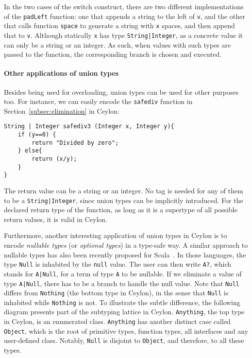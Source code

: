 In the two cases of the switch construct, there are two different implementations
of the \lstinline{padLeft} function: one that appends a string to the left of \lstinline{v},
and the other that calls function \lstinline{space} to generate a string with \lstinline{x} spaces,
and then append that to \lstinline{v}.
Although statically \lstinline{x} has type \lstinline{String|Integer}, as a concrete value
it can only be a string or an integer.
As such, when values with such types are passed to the function,
the corresponding branch is chosen and executed.

\paragraph{Other applications of union types}
Besides being used for overloading, union types can be used for other purposes too.
For instance, we can easily encode the \lstinline{safediv} function in Section~\ref{subsec:elimination}
in Ceylon:
%
\begin{lstlisting}
String | Integer safediv3 (Integer x, Integer y){
	if (y==0) {
		return "Divided by zero";
	} else{
		return (x/y);
	}
}
\end{lstlisting}
%
The return value can be a string or an integer.
No tag is needed for any of them to be a \lstinline{String|Integer},
since union types can be implicitly introduced.
For the declared return type of the function, as long as it is
a supertype of all possible return values, it is valid
in Ceylon.


Furthermore, another interesting application of union types in Ceylon is to
encode \textit{nullable types} (or \textit{optional types}) in a type-safe way.
A similar approach to nullable types has also been recently proposed for
Scala~\citep{nieto20nulls}. In those languages, the type \lstinline{Null} is
inhabited by the \lstinline{null} value. The user can then write \lstinline{A?},
which stands for \lstinline{A|Null}, for a term of type \lstinline{A} to be
nullable. If we eliminate a value of type \lstinline{A|Null}, there has to be a
branch to handle the null value. Note that \lstinline{Null} differs from
\lstinline{Nothing} (the bottom type in Ceylon), in the sense that
\lstinline{Null} is inhabited while \lstinline{Nothing} is not. To illustrate
the subtle difference, the following diagram presents part of the subtyping
lattice in Ceylon. \lstinline{Anything}, the top type in Ceylon, is an
enumerated class. \lstinline{Anything} has another distinct case called
\lstinline{Object}, which is the root of primitive types, function types, all
interfaces and any user-defined class. Notably, \lstinline{Null} is disjoint to
\lstinline{Object}, and therefore, to all these types.

